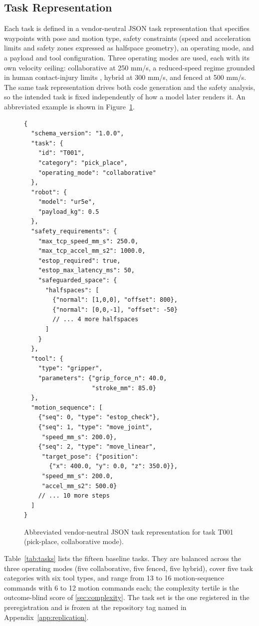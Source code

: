 \documentclass{ieeeaccess}
\begin{document}
\subsection{Task Representation}\label{sec:task-ir}
Each task is defined in a vendor-neutral JSON task representation that specifies waypoints
with pose and motion type, safety constraints (speed and acceleration limits and
safety zones expressed as halfspace geometry), an operating mode, and a payload and
tool configuration. Three operating modes are used, each with its own velocity
ceiling: collaborative at 250 mm/s, a reduced-speed regime grounded in human
contact-injury limits \cite{ref59}, hybrid at 300 mm/s, and fenced at 500 mm/s. The
same task representation drives both code generation and the safety analysis, so the
intended task is fixed independently of how a model later renders it. An abbreviated example is shown in Figure~\ref{fig:taskjson}.

\begin{figure}[h]
\centering
\def\xfigwd{\columnwidth}%
\footnotesize
\begin{verbatim}
{
  "schema_version": "1.0.0",
  "task": {
    "id": "T001",
    "category": "pick_place",
    "operating_mode": "collaborative"
  },
  "robot": {
    "model": "ur5e",
    "payload_kg": 0.5
  },
  "safety_requirements": {
    "max_tcp_speed_mm_s": 250.0,
    "max_tcp_accel_mm_s2": 1000.0,
    "estop_required": true,
    "estop_max_latency_ms": 50,
    "safeguarded_space": {
      "halfspaces": [
        {"normal": [1,0,0], "offset": 800},
        {"normal": [0,0,-1], "offset": -50}
        // ... 4 more halfspaces
      ]
    }
  },
  "tool": {
    "type": "gripper",
    "parameters": {"grip_force_n": 40.0,
                   "stroke_mm": 85.0}
  },
  "motion_sequence": [
    {"seq": 0, "type": "estop_check"},
    {"seq": 1, "type": "move_joint",
     "speed_mm_s": 200.0},
    {"seq": 2, "type": "move_linear",
     "target_pose": {"position":
       {"x": 400.0, "y": 0.0, "z": 350.0}},
     "speed_mm_s": 200.0,
     "accel_mm_s2": 500.0}
    // ... 10 more steps
  ]
}
\end{verbatim}
\caption{Abbreviated vendor-neutral JSON task representation for task T001
(pick-place, collaborative mode).}
\label{fig:taskjson}
\end{figure}

Table~\ref{tab:tasks} lists the fifteen baseline tasks. They are balanced across the
three operating modes (five collaborative, five fenced, five hybrid), cover five task
categories with six tool types, and range from 13 to 16 motion-sequence commands with 6
to 12 motion commands each; the complexity tertile is the outcome-blind score of
\ref{sec:complexity}. The task set is the one registered in the preregistration and is
frozen at the repository tag named in Appendix~\ref{app:replication}.
\end{document}
